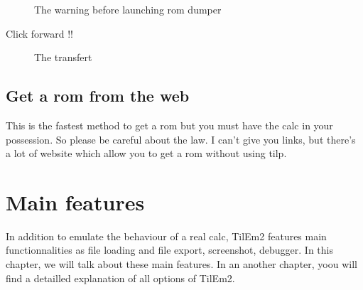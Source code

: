 \documentclass[10pt]{report}
\begin{document}
\begin{figure}[H]
\centering
{}
\caption{The warning before launching rom dumper}
\end{figure}
Click forward !!\newline

\begin{figure}[H]
\centering
{}
\caption{The transfert}
\end{figure}


\section{Get a rom from the web}

This is the fastest method to get a rom but you must have the calc in your possession.\newline
So please be careful about the law.\newline
I can't give you links, but there's a lot of website which allow you to get a rom without using tilp.\newline

\chapter{Main features}

In addition to emulate the behaviour of a real calc, TilEm2 features main functionnalities as file loading and file export, screenshot, debugger.\newline
In this chapter, we will talk about these main features.\newline
In an another chapter, yoou will find a detailled explanation of all options of TilEm2.\newline
\end{document}

